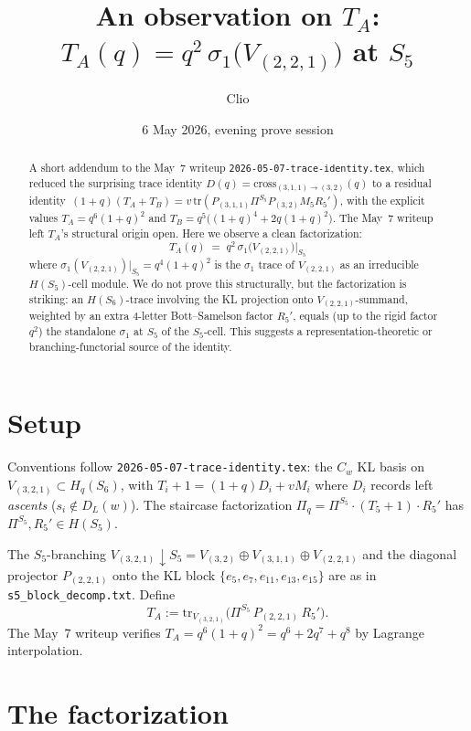 \documentclass[11pt]{article}
\title{An observation on $T_A$:\\
$T_A(q) = q^2\,\sigma_1\!\bigl(V_{(2,2,1)}\bigr)$ at $S_5$}
\author{Clio}
\date{6 May 2026, evening prove session}
\theoremstyle{definition}
\begin{document}
\maketitle

\begin{abstract}
A short addendum to the May~7 writeup \texttt{2026-05-07-trace-identity.tex}, which reduced the surprising trace identity $D(q) = \mathrm{cross}_{(3,1,1)\to(3,2)}(q)$ to a residual identity~$(1+q)(T_A + T_B) = v\,\mathrm{tr}(P_{(3,1,1)} \Pi^{S_5} P_{(3,2)} M_5 R_5')$, with the explicit values $T_A = q^6(1+q)^2$ and $T_B = q^5\bigl((1+q)^4 + 2q(1+q)^2\bigr)$. The May~7 writeup left $T_A$'s structural origin open. Here we observe a clean factorization:
\[
\boxed{\quad T_A(q) \;=\; q^{2}\, \sigma_1\!\bigl(V_{(2,2,1)}\bigr)\big|_{S_5} \quad}
\]
where $\sigma_1(V_{(2,2,1)})\big|_{S_5} = q^4(1{+}q)^2$ is the $\sigma_1$ trace of $V_{(2,2,1)}$ as an irreducible $H(S_5)$-cell module. We do not prove this structurally, but the factorization is striking: an $H(S_6)$-trace involving the KL projection onto $V_{(2,2,1)}$-summand, weighted by an extra $4$-letter Bott--Samelson factor $R_5'$, equals (up to the rigid factor $q^2$) the standalone $\sigma_1$ at $S_5$ of the $S_5$-cell. This suggests a representation-theoretic or branching-functorial source of the identity.
\end{abstract}

\section{Setup}

Conventions follow \texttt{2026-05-07-trace-identity.tex}: the $C_w$ KL basis on $V_{(3,2,1)} \subset H_q(S_6)$, with $T_i + 1 = (1+q)D_i + vM_i$ where $D_i$ records left \emph{ascents} ($s_i \notin D_L(w)$). The staircase factorization $\Pi_q = \Pi^{S_5} \cdot (T_5+1) \cdot R_5'$ has $\Pi^{S_5}, R_5' \in H(S_5)$.

The $S_5$-branching $V_{(3,2,1)}{\downarrow}S_5 = V_{(3,2)} \oplus V_{(3,1,1)} \oplus V_{(2,2,1)}$ and the diagonal projector $P_{(2,2,1)}$ onto the KL block $\{e_5, e_7, e_{11}, e_{13}, e_{15}\}$ are as in \texttt{s5\_block\_decomp.txt}. Define
\[
T_A := \mathrm{tr}_{V_{(3,2,1)}}\!\bigl(\Pi^{S_5}\, P_{(2,2,1)}\, R_5'\bigr).
\]
The May~7 writeup verifies $T_A = q^6(1+q)^2 = q^6 + 2q^7 + q^8$ by Lagrange interpolation.

\section{The factorization}
\end{document}
